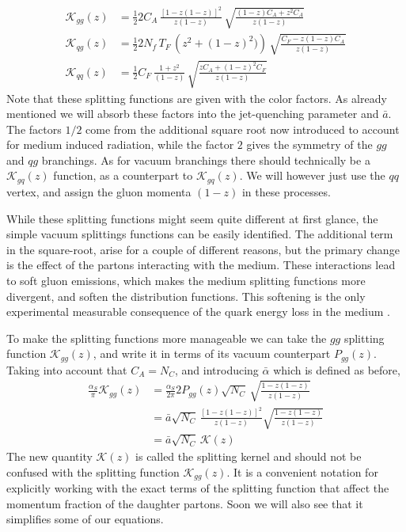 \documentclass[main.tex]{subfiles}
\begin{document}
\begin{align}
    \mathcal{K}_{gg}(z) &= \frac{1}{2} 2 C_A \, \frac{[1-z(1-z)]^2}{z(1-z)} \, \sqrt{\frac{(1-z)C_A + z^2 C_A}{z(1-z)}} \label{eqn: medium_splittingfunctions_gg} \\
    \mathcal{K}_{qg}(z) &= \frac{1}{2} 2 N_f \, T_F \, \left(z^2 +(1-z)^2)\right) \, \sqrt{\frac{C_F - z(1-z)C_A}{z(1-z)}} \label{eqn: medium_splittingfunctions_qg} \\
    \mathcal{K}_{qq}(z) &= \frac{1}{2} C_F \, \frac{1+z^2}{(1-z)} \, \sqrt{\frac{zC_A + (1-z)^2 C_F}{z(1-z)}} \label{eqn: medium_splittingfunctions_qq}
\end{align}
Note that these splitting functions are given with the color factors. As already mentioned we will absorb these factors into the jet-quenching parameter and \(\bar a\). The factors \(1/2\) come from the additional square root now introduced to account for medium induced radiation, while the factor \(2\) gives the symmetry of the \(gg\) and \(qg\) branchings. As for vacuum branchings there should technically be a \(\mathcal{K}_{gq}(z)\) function, as a  counterpart to \(\mathcal{K}_{gq}(z)\). We will however just use the \(qq\) vertex, and assign the gluon momenta \((1-z)\) in these processes.

While these splitting functions might seem quite different at first glance, the simple vacuum splittings functions can be easily identified. The additional term in the square-root, arise for a couple of different reasons, but the primary change is the effect of the partons interacting with the medium. These interactions lead to soft gluon emissions, which makes the medium splitting functions more divergent, and soften the distribution functions. This softening is the only experimental measurable consequence of the quark energy loss in the medium \cite{Wang_2001_Multiple_Parton_Scattering}.

To make the splitting functions more manageable we can take the \(gg\) splitting function \(\mathcal{K}_{gg}(z)\), and write it in terms of its vacuum counterpart \(P_{gg}(z)\). Taking into account that \(C_A=N_C\), and introducing \(\bar \alpha\) which is defined as before,
\begin{align}\label{eqn: vacuumtomedium_ggg_splitting_relation}
    \frac{\alpha_S}{\pi} \mathcal{K}_{gg}(z) &= \frac{\alpha_S}{2 \pi} 2 P_{gg}(z) \sqrt{N_C} \,\sqrt{\frac{1-z(1-z)}{z(1-z)}} \nonumber \\
    &= \bar a \sqrt{N_C}\, \frac{\left[1-z(1-z)\right]^2}{z(1-z)}  \sqrt{\frac{1-z(1-z)}{z(1-z)}} \nonumber \\
    &= \bar a \sqrt{N_C} \, \mathcal{K}(z)
\end{align}
The new quantity \(\mathcal{K}(z)\) is called the splitting kernel and should not be confused with the splitting function \(\mathcal{K}_{gg}(z)\). It is a convenient  notation for explicitly working with the exact terms of the splitting function that affect the momentum fraction of the daughter partons. Soon we will also see that it simplifies some of our equations. 
\end{document}
